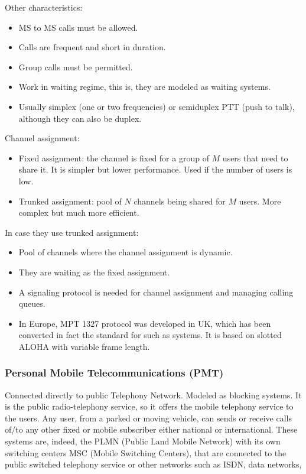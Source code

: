 \documentclass[../main.tex]{subfiles}
\begin{document}
Other characteristics:

\begin{itemize}
	\item MS to MS calls must be allowed.
	\item Calls are frequent and short in duration.
	\item Group calls must be permitted.
	\item Work in waiting regime, this is, they are modeled as waiting systems.
	\item Usually simplex (one or two frequencies) or semiduplex PTT (push to talk), although they can also be duplex.
\end{itemize}

Channel assignment:

\begin{itemize}
	\item Fixed assignment: the channel is fixed for a group of $M$ users that need to share it. It is simpler but lower performance. Used if the number of users is low.
	\item Trunked assignment: pool of $N$ channels being shared for $M$ users. More complex but much more efficient.
\end{itemize}

In case they use trunked assignment:

\begin{itemize}
	\item Pool of channels where the channel assignment is dynamic.
	\item They are waiting as the fixed assignment.
	\item A signaling protocol is needed for channel assignment and managing calling queues.
	\item In Europe, MPT 1327 protocol was developed in UK, which has been converted in fact the standard for such as systems. It is based on slotted ALOHA with variable frame length.
\end{itemize}

\subsubsection{Personal Mobile Telecommunications (PMT)}

Connected directly to public Telephony Network. Modeled as blocking systems. It is the public radio-telephony service, so it offers the mobile telephony service to the users. Any user, from a parked or moving vehicle, can sends or receive calls of/to any other fixed or mobile subscriber either national or international. These systems are, indeed, the PLMN (Public Land Mobile Network) with its own switching centers MSC (Mobile Switching Centers), that are connected to the public switched telephony service or other networks such as ISDN, data networks,
\end{document}
